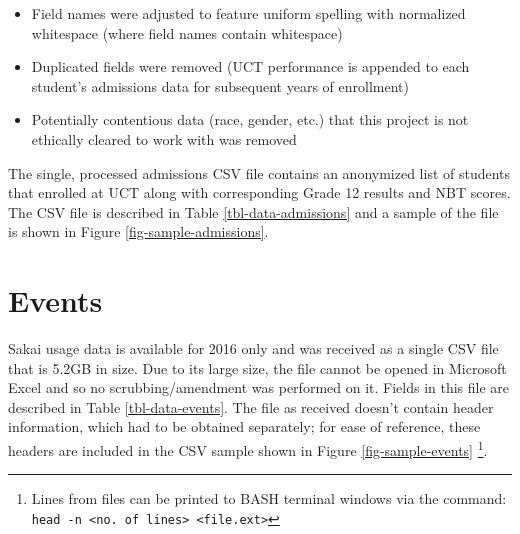 \begin{itemize}
    \item Field names were adjusted to feature uniform spelling with normalized whitespace (where field names contain whitespace)
    \item Duplicated fields were removed (UCT performance is appended to each student's admissions data for subsequent years of enrollment)
    \item Potentially contentious data (race, gender, etc.) that this project is not ethically cleared to work with was removed
\end{itemize}

The single, processed admissions CSV file contains an anonymized list of students that enrolled at UCT along with corresponding Grade 12 results and NBT scores. The CSV file is described in Table \ref{tbl-data-admissions} and a sample of the file is shown in Figure \ref{fig-sample-admissions}.

\section{Events}
Sakai usage data is available for 2016 only and was received as a single CSV file that is 5.2GB in size. Due to its large size, the file cannot be opened in Microsoft Excel and so no scrubbing/amendment was performed on it. Fields in this file are described in Table \ref{tbl-data-events}. The file as received doesn't contain header information, which had to be obtained separately; for ease of reference, these headers are included in the CSV sample shown in Figure \ref{fig-sample-events} \footnote{Lines from files can be printed to BASH terminal windows via the command: \texttt{head -n <no. of lines> <file.ext>}}.





